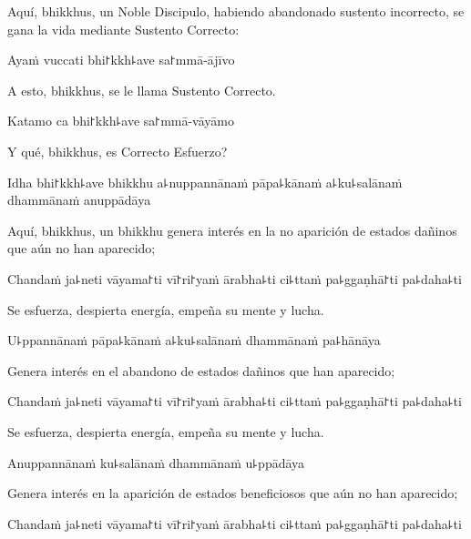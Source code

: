 \begin{english}
	Aquí, bhikkhus, un Noble Discipulo, habiendo abandonado sustento incorrecto, se gana la vida mediante Sustento Correcto:
\end{english}

Ayaṁ vuccati bhi꜓kkh꜕ave sa꜓mmā-ājīvo

\begin{english}
	A esto, bhikkhus, se le llama Sustento Correcto.
\end{english}

Katamo ca bhi꜓kkh꜕ave sa꜓mmā-vāyāmo

\begin{english}
	Y qué, bhikkhus, es Correcto Esfuerzo?
\end{english}

Idha bhi꜓kkh꜕ave bhikkhu a꜕nuppannānaṁ pāpa꜕kānaṁ a꜕ku꜕salānaṁ dhammānaṁ anuppādāya

\begin{english}
	Aquí, bhikkhus, un bhikkhu genera interés en la no aparición de estados dañinos que aún no han aparecido;
	
\end{english}

Chandaṁ ja꜕neti vāyama꜓ti vī꜓ri꜓yaṁ ārabha꜕ti ci꜕ttaṁ pa꜕ggaṇhā꜓ti pa꜕daha꜕ti

\begin{english}
	Se esfuerza, despierta energía, empeña su mente y lucha.
\end{english}

U꜕ppannānaṁ pāpa꜕kānaṁ a꜕ku꜕salānaṁ dhammānaṁ pa꜕hānāya

\begin{english}
	Genera interés en el abandono de estados dañinos que han aparecido;
\end{english}

Chandaṁ ja꜕neti vāyama꜓ti vī꜓ri꜓yaṁ ārabha꜕ti ci꜕ttaṁ pa꜕ggaṇhā꜓ti pa꜕daha꜕ti

\begin{english}
	Se esfuerza, despierta energía, empeña su mente y lucha.
\end{english}

Anuppannānaṁ ku꜕salānaṁ dhammānaṁ u꜕ppādāya

\begin{english}
	Genera interés en la aparición de estados beneficiosos que aún no han aparecido;
\end{english}

Chandaṁ ja꜕neti vāyama꜓ti vī꜓ri꜓yaṁ ārabha꜕ti ci꜕ttaṁ pa꜕ggaṇhā꜓ti pa꜕daha꜕ti

